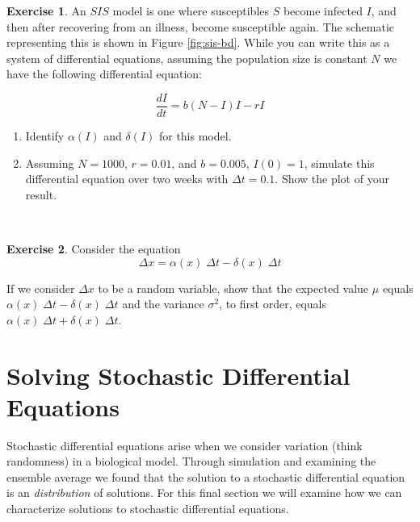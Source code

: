 \documentclass[
]{book}
\theoremstyle{definition}
\theoremstyle{definition}
\theoremstyle{definition}
\newtheorem{exercise}{Exercise}[chapter]
\theoremstyle{remark}
\begin{document}
\begin{exercise}
\protect\hypertarget{exr:unnamed-chunk-356}{}{\label{exr:unnamed-chunk-356} }An \(SIS\) model is one where susceptibles \(S\) become infected \(I\), and then after recovering from an illness, become susceptible again. The schematic representing this is shown in Figure \ref{fig:sis-bd}. While you can write this as a system of differential equations, assuming the population size is constant \(N\) we have the following differential equation:

\begin{equation}
\frac{dI}{dt} = b(N-I) I - r I
\end{equation}

\begin{enumerate}
\item Identify $\alpha(I)$ and $\delta(I)$ for this model.
\item Assuming $N=1000$, $r=0.01$, and $b=0.005$, $I(0)=1$, simulate this differential equation over two weeks with $\Delta t = 0.1$.  Show the plot of your result.
\end{enumerate}
\end{exercise}

~

\begin{exercise}
\protect\hypertarget{exr:unnamed-chunk-357}{}{\label{exr:unnamed-chunk-357} }Consider the equation
\begin{equation*}
\Delta x = \alpha(x) \; \Delta t - \delta(x) \; \Delta t
\end{equation*}

If we consider \(\Delta x\) to be a random variable, show that the expected value \(\mu\) equals \(\alpha(x) \; \Delta t - \delta(x) \; \Delta t\) and the variance \(\sigma^{2}\), to first order, equals \(\alpha(x) \; \Delta t + \delta(x) \; \Delta t\).
\end{exercise}

\hypertarget{solvingSDEs-27}{%
\chapter{Solving Stochastic Differential Equations}\label{solvingSDEs-27}}

Stochastic differential equations arise when we consider variation (think randomness) in a biological model. Through simulation and examining the ensemble average we found that the solution to a stochastic differential equation is an \emph{distribution} of solutions. For this final section we will examine how we can characterize solutions to stochastic differential equations.
\end{document}
